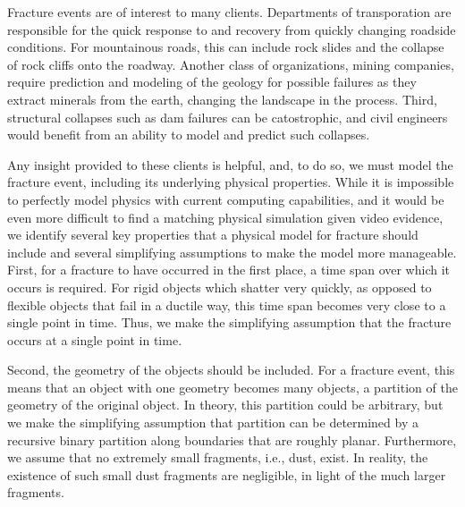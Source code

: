 \documentclass[10pt,twocolumn,letterpaper]{article}
\begin{document}
Fracture events are of interest to many clients. Departments of 
transporation are responsible for the quick response to and recovery from 
quickly changing roadside conditions. For mountainous roads, this can include 
rock slides and 
the collapse of rock cliffs onto the roadway. Another class of organizations, 
mining companies, require prediction and modeling of the geology for possible 
failures as they extract 
minerals from the earth, changing the landscape in the process. Third, 
structural collapses such as dam failures 
can be catostrophic, and civil engineers would benefit from 
an ability to model and predict such collapses.

Any insight provided to these clients is helpful, and, to do so, we must model 
the fracture event, including its underlying physical properties. While 
it is impossible to perfectly model physics with current computing capabilities, 
and it would be even more difficult to find a matching physical simulation given 
video evidence, we identify several key properties that a physical model for 
fracture should include and several simplifying assumptions to make the model 
more manageable. First, for a fracture to have occurred in the first 
place, a time span over which it occurs is required. For rigid objects which 
shatter very quickly, 
as opposed to flexible objects that fail in a ductile way, this time 
span becomes very close to a single point in time. Thus, we make the 
simplifying assumption that the fracture occurs at a single point in time.

Second, the geometry of the objects should be included. For a fracture event, 
this means that an object with one geometry becomes many objects, a partition 
of the geometry of the original object. In theory, this partition could be 
arbitrary, but we make the simplifying assumption that partition can be 
determined by a recursive binary partition along boundaries that are roughly 
planar. Furthermore, we assume that no extremely small fragments, i.e., dust, 
exist. In reality, the existence of such small dust fragments are negligible, in 
light of the much larger fragments.
\end{document}
